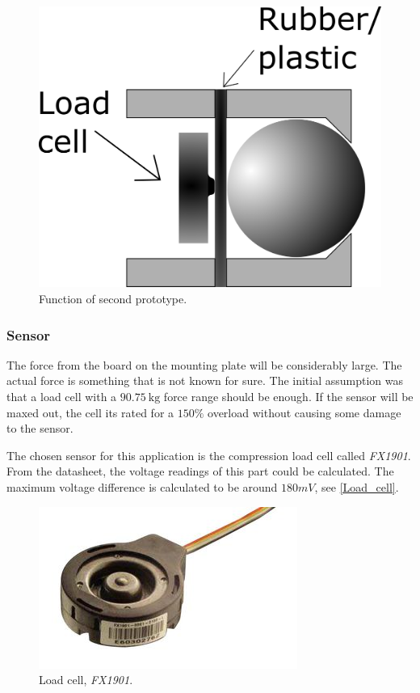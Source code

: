 \begin{figure}[H]
\begin{center}
	\includegraphics[width = .45\textwidth]{Figures/Press_sens_func_2.png}
	\caption{Function of second prototype.}
	\label{Press_sens_prot_2}
\end{center}
\end{figure}



\subsubsection{Sensor}
The force from the board on the mounting plate will be considerably large. The actual force is something that is not known for sure. The initial assumption was that a load cell with a $90.75~\textrm{kg}$ force range should be enough. If the sensor will be maxed out, the cell its rated for a $150\%$ overload without causing some damage to the sensor. 

The chosen sensor for this application is the compression load cell called \emph{FX1901}. 
From the datasheet\cite{load_cell}, the voltage readings of this part could be calculated. The maximum voltage difference is calculated to be around $180mV$, see \autoref{Load_cell}.
\begin{figure}[H]
\begin{center}
	\includegraphics[width = .45\textwidth]{Figures/Load_cell.png}
	\caption{Load cell, \emph{FX1901}.}
	\label{Load_cell}
\end{center}
\end{figure}


